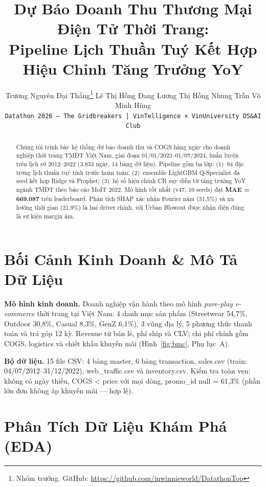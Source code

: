 \documentclass{article}
\title{Dự Báo Doanh Thu Thương Mại Điện Tử Thời Trang:\\
       Pipeline Lịch Thuần Tuý Kết Hợp Hiệu Chỉnh Tăng Trưởng YoY}
\author{%
  Trương Nguyên Đại Thắng\thanks{Nhóm trưởng. GitHub: \url{https://github.com/inwinnieworld/DatathonTop}} \And
  Lê Thị Hồng Đang \And
  Lương Thị Hồng Nhung \And
  Trần Võ Minh Hùng \\[2pt]
  \texttt{Datathon 2026 — The Gridbreakers | VinTelligence × VinUniversity DS\&AI Club}
}
\begin{document}
\maketitle

\begin{abstract}
Chúng tôi trình bày hệ thống dự báo doanh thu và COGS hàng ngày cho doanh nghiệp thời trang TMĐT Việt Nam, giai đoạn 01/01/2023–01/07/2024, huấn luyện trên lịch sử 2012–2022 (3.833 ngày, 14 bảng dữ liệu). Pipeline gồm ba lớp: (1)~94 đặc trưng lịch thuần tuý tính trước hoàn toàn; (2)~ensemble LightGBM Q-Specialist đa seed kết hợp Ridge và Prophet; (3)~hệ số hiệu chỉnh CR suy diễn từ tăng trưởng YoY ngành TMĐT theo báo cáo MoIT 2022. Mô hình tốt nhất (v47, 10 seeds) đạt \textbf{MAE = 669.087} trên leaderboard. Phân tích SHAP xác nhận Fourier năm (31,5\%) và xu hướng thời gian (21,9\%) là hai driver chính, với Urban Blowout được nhận diện đúng là sự kiện margin âm.
\end{abstract}

\section{Bối Cảnh Kinh Doanh \& Mô Tả Dữ Liệu}

\textbf{Mô hình kinh doanh.} Doanh nghiệp vận hành theo mô hình \textit{pure-play e-commerce} thời trang tại Việt Nam: 4 danh mục sản phẩm (Streetwear 54,7\%, Outdoor 30,8\%, Casual 8,3\%, GenZ 6,1\%), 3 vùng địa lý, 5 phương thức thanh toán và trả góp 12 kỳ. Revenue từ bán lẻ, phí ship và CLV; chi phí chính gồm COGS, logistics và chiết khấu khuyến mãi (Hình~\ref{fig:bmc}, Phụ lục~A).

\textbf{Bộ dữ liệu.} 15 file CSV: 4 bảng master, 6 bảng transaction, sales.csv (train: 04/07/2012–31/12/2022), web\_traffic.csv và inventory.csv. Kiểm tra toàn vẹn: không có ngày thiếu, COGS < price với mọi dòng, promo\_id null = 61,3\% (phần lớn đơn không áp khuyến mãi — hợp lệ).

\section{Phân Tích Dữ Liệu Khám Phá (EDA)}
\end{document}
